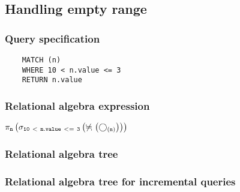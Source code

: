 	\subsection{Handling empty range}

	\subsubsection*{Query specification}

	\begin{lstlisting}
	MATCH (n)
	WHERE 10 < n.value <= 3
	RETURN n.value
	\end{lstlisting}


	\subsubsection*{Relational algebra expression}

	$\projection{\var{n}} \left(\selection{\mathtt{10~<~n.value~<=~3}} \left(\alldifferent{} \left(\getvertices{n}{}\right)\right)\right)$

	\subsubsection*{Relational algebra tree}


	\subsubsection*{Relational algebra tree for incremental queries}

